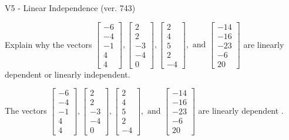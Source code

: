 \begin{exercise}
  \begin{exerciseTitle}V5 - Linear Independence (ver. 743)\end{exerciseTitle}
  \begin{exerciseStatement}
    Explain why the vectors \(\left[\begin{array}{r}
-6 \\
-4 \\
-1 \\
4 \\
4
\end{array}\right] , \left[\begin{array}{r}
2 \\
2 \\
-3 \\
-4 \\
0
\end{array}\right] , \left[\begin{array}{r}
2 \\
4 \\
5 \\
2 \\
-4
\end{array}\right] , \text{ and } \left[\begin{array}{r}
-14 \\
-16 \\
-23 \\
-6 \\
20
\end{array}\right]\) are linearly dependent or linearly independent.	


  \end{exerciseStatement}
  \begin{exerciseAnswer}
   The vectors \(\left[\begin{array}{r}
-6 \\
-4 \\
-1 \\
4 \\
4
\end{array}\right] , \left[\begin{array}{r}
2 \\
2 \\
-3 \\
-4 \\
0
\end{array}\right] , \left[\begin{array}{r}
2 \\
4 \\
5 \\
2 \\
-4
\end{array}\right] , \text{ and } \left[\begin{array}{r}
-14 \\
-16 \\
-23 \\
-6 \\
20
\end{array}\right]\) are 
  	 linearly dependent  .
  


  \end{exerciseAnswer}
\end{exercise}